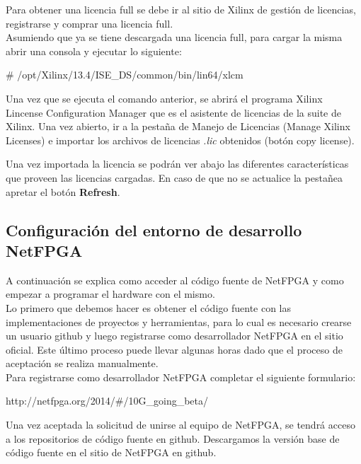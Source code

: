 Para obtener una licencia full se debe ir al sitio de Xilinx de gestión de licencias, registrarse y comprar una licencia full.\\

Asumiendo que ya se tiene descargada una licencia full, para cargar la misma abrir una consola y ejecutar lo siguiente:\\

\begin{bash}
# /opt/Xilinx/13.4/ISE_DS/common/bin/lin64/xlcm
\end{bash}

Una vez que se ejecuta el comando anterior, se abrirá el programa  Xilinx Lincense Configuration Manager que es el asistente de licencias de la suite de Xilinx. Una vez abierto, ir a la pestaña de Manejo de Licencias (Manage Xilinx Licenses) e importar los archivos de licencias \emph{.lic} obtenidos (botón copy license).

Una vez importada la licencia se podrán ver abajo las diferentes características que proveen las licencias cargadas. En caso de que no se actualice la pestañea apretar el botón \textbf{Refresh}.


\subsection{Configuración del entorno de desarrollo NetFPGA}
A continuación se explica como acceder al código fuente de NetFPGA y como empezar a programar el hardware con el mismo.\\

Lo primero que debemos hacer es obtener el código fuente con las implementaciones de proyectos y herramientas, para lo cual es necesario crearse un usuario github y luego registrarse como desarrollador NetFPGA en el sitio oficial. Este último proceso puede llevar algunas horas dado que el proceso de aceptación se realiza manualmente.\\

Para registrarse como desarrollador NetFPGA completar el siguiente formulario:

\begin{center}
http://netfpga.org/2014/\#/10G\_going\_beta/
\end{center}

Una vez aceptada la solicitud de unirse al equipo de NetFPGA, se tendrá acceso a los repositorios de código fuente en github. Descargamos la versión base de código fuente en el sitio de NetFPGA en github.

